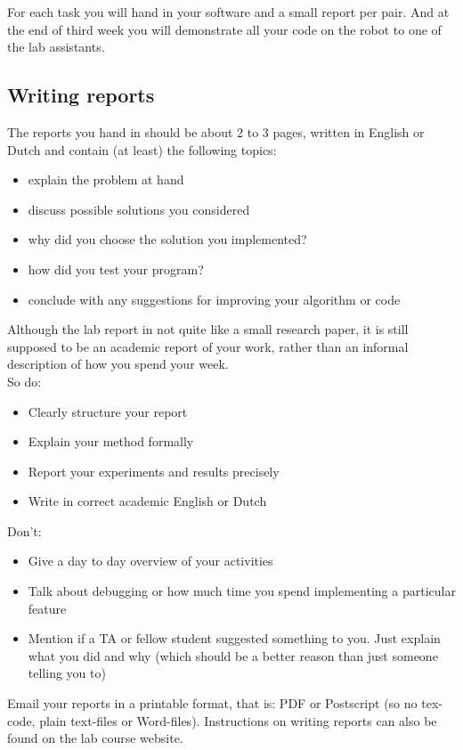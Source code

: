 \documentclass[10pt]{scrartcl}
\begin{document}
For each task you will hand in your software and a small report per
pair. And at the end of third week you will demonstrate all your code on the robot
to one of the lab assistants. 


\subsection{Writing reports}
The reports you hand in should be about 2 to 3 pages, written in English or Dutch 
and contain (at least) the following topics: 
\begin{itemize}
  \item explain the problem at hand
  \item discuss possible solutions you considered
  \item why did you choose the solution you implemented?
  \item how did you test your program?
  \item conclude with any suggestions for improving your algorithm or code
\end{itemize}

Although the lab report in not quite like a small research paper, it is still supposed to
be an academic report of your work, rather than an informal description of how you spend your week.\\

\noindent So do:
\begin{itemize}
\item Clearly structure your report
\item Explain your method formally
\item Report your experiments and results precisely
\item Write in correct academic English or Dutch
\end{itemize}
Don't:
\begin{itemize}
\item Give a day to day overview of your activities
\item Talk about debugging or how much time you spend implementing a particular feature
\item Mention if a TA or fellow student suggested something to you. Just explain what you did and why (which should be a better reason than just someone telling you to)
\end{itemize}

Email your reports in a printable format, that is: PDF or Postscript (so
no tex-code, plain text-files or Word-files).
Instructions on writing reports can also be found on the lab course website.
\end{document}
